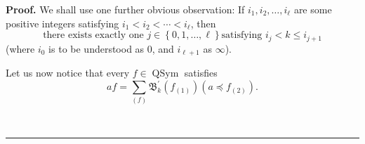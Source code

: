 \documentclass[numbers=enddot,12pt,final,onecolumn,notitlepage,abstracton]{scrartcl}%
\theoremstyle{definition}
\newenvironment{proof}[1][Proof]{\noindent\textbf{#1.} }{\ \rule{0.5em}{0.5em}}
\newenvironment{verlong}{}{}
\let\sumnonlimits\sum
\renewcommand{\sum}{\sumnonlimits\limits}
\begin{document}
\begin{verlong}
\begin{proof}
We shall use one further obvious observation: If $i_{1},i_{2},\ldots,i_{\ell}$
are some positive integers satisfying $i_{1}<i_{2}<\cdots<i_{\ell}$, then%
\begin{equation}
\text{there exists exactly one }j\in\left\{  0,1,\ldots,\ell\right\}  \text{
satisfying }i_{j}<k\leq i_{j+1} \label{pf.thm.tvidend.exactlyonej}%
\end{equation}
(where $i_{0}$ is to be understood as $0$, and $i_{\ell+1}$ as $\infty$).

Let us now notice that every $f\in\operatorname*{QSym}$ satisfies%
\begin{equation}
af=\sum_{\left(  f\right)  }\mathfrak{B}_{k}^{\prime}\left(  f_{\left(
1\right)  }\right)  \left(  a\left.  \preceq\right.  f_{\left(  2\right)
}\right)  . \label{pf.thm.tvidend.mainlem}%
\end{equation}



\end{proof}
\end{verlong}
\end{document}
